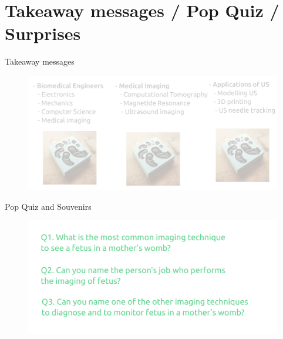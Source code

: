 \section{Takeaway messages / Pop Quiz / Surprises }



{
\begin{frame}{Takeaway messages}
  \begin{figure}
  \centering
  \includegraphics[width=1.0\textwidth]{./figures/takeaways/versions/drawing-v01}
  \end{figure}

\end{frame}
}

{
\begin{frame}{Pop Quiz and Souvenirs}
  \begin{figure}
  \centering
  \includegraphics[width=1.0\textwidth]{./figures/popquiz-souvenirs/versions/drawing-Qs-v01}
  \end{figure}

\end{frame}
}

